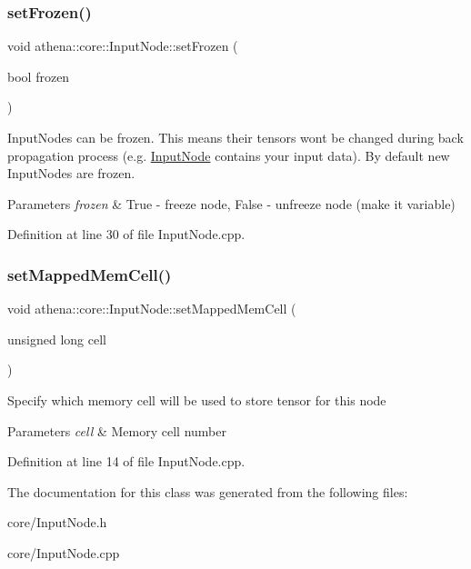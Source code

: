 \subsubsection{\texorpdfstring{set\+Frozen()}{setFrozen()}}
{\footnotesize\ttfamily void athena\+::core\+::\+Input\+Node\+::set\+Frozen (\begin{DoxyParamCaption}\item[{bool}]{frozen }\end{DoxyParamCaption})}

Input\+Nodes can be frozen. This means their tensors won\textquotesingle{}t be changed during back propagation process (e.\+g. \mbox{\hyperlink{classathena_1_1core_1_1_input_node}{Input\+Node}} contains your input data). By default new Input\+Nodes are frozen. 
\begin{DoxyParams}{Parameters}
{\em frozen} & True -\/ freeze node, False -\/ unfreeze node (make it variable) \\
\hline
\end{DoxyParams}


Definition at line 30 of file Input\+Node.\+cpp.

\mbox{\label{classathena_1_1core_1_1_input_node_a8c17ce96d989454e6316c1c049c2c98d}} 
\subsubsection{\texorpdfstring{set\+Mapped\+Mem\+Cell()}{setMappedMemCell()}}
{\footnotesize\ttfamily void athena\+::core\+::\+Input\+Node\+::set\+Mapped\+Mem\+Cell (\begin{DoxyParamCaption}\item[{unsigned long}]{cell }\end{DoxyParamCaption})}

Specify which memory cell will be used to store tensor for this node 
\begin{DoxyParams}{Parameters}
{\em cell} & Memory cell number \\
\hline
\end{DoxyParams}


Definition at line 14 of file Input\+Node.\+cpp.



The documentation for this class was generated from the following files\+:\begin{DoxyCompactItemize}
\item 
core/Input\+Node.\+h\item 
core/Input\+Node.\+cpp\end{DoxyCompactItemize}

